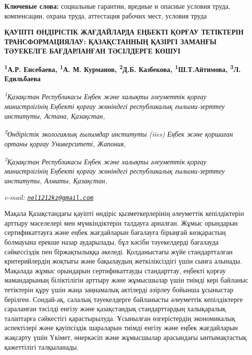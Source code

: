 {\bfseries Ключевые слова:} социальные гарантии, вредные и опасные условия
труда, компенсации, охрана труда, аттестация рабочих мест, условия труда

\begin{articleheader}
{\bfseries ҚАУІПТІ ӨНДІРІСТІК ЖАҒДАЙЛАРДА ЕҢБЕКТІ ҚОРҒАУ ТЕТІКТЕРІН
ТРАНСФОРМАЦИЯЛАУ: ҚАЗАҚСТАННЫҢ ҚАЗІРГІ ЗАМАНҒЫ ТӘУЕКЕЛГЕ БАҒДАРЛАНҒАН
ТӘСІЛДЕРГЕ КӨШУІ}

{\bfseries
\textsuperscript{1}А.Р. Енсебаева\textsuperscript{\envelope },
\textsuperscript{1}А. М. Курманов,
\textsuperscript{2}Д.Б. Казбекова,
\textsuperscript{1}Ш.Т.Айтимова,
\textsuperscript{3}Л. Едильбаева}
\end{articleheader}

\begin{affiliation}
\emph{\textsuperscript{1}Қазақстан Республикасы Еңбек және халықты
әлеуметтік қорғау министрлігінің Еңбекті қорғау жөніндегі республикалық
ғылыми-зерттеу институты, Астана, Қазақстан,}

\emph{\textsuperscript{2}Өндірістік экологиялық ғылымдар институты
(iies) Еңбек және қоршаған ортаны қорғау Университеті, Жапония,}

\emph{\textsuperscript{3}Қазақстан Республикасы Еңбек және халықты
әлеуметтік қорғау министрлігінің Еңбекті қорғау жөніндегі республикалық
ғылыми-зерттеу институты, Алматы, Қазақстан,}

\emph{e-mail:
\href{mailto:nel1212kz@gmail.com}{\nolinkurl{nel1212kz@gmail.com}}}
\end{affiliation}

Мақала Қазақстандағы қауіпті өндіріс қызметкерлерінің әлеуметтік
кепілдіктерін арттыру мәселелері мен мүмкіндіктерін талдауға арналған.
Жұмыс орындарын сертификаттауға және еңбек жағдайларын бағалауға
бірыңғай көзқарастың болмауына ерекше назар аударылады, бұл кәсіби
тәуекелдерді бағалауда сәйкессіздік пен біржақтылыққа әкеледі.
Қолданыстағы жүйе стандартталған критерийлердің жоқтығы және бақылаудың
жеткіліксіздігі үшін сынға алынады. Мақалада жұмыс орындарын
сертификаттауды стандарттау, еңбекті қорғау мамандарының біліктілігін
арттыру және жұмысшылар үшін тиімді кері байланыс тетіктерін құру үшін
жаңа заңнамалық актілерді әзірлеу бойынша ұсыныстар берілген. Сондай-ақ,
салалық тәуекелдерге байланысты әлеуметтік кепілдіктерге сараланған
тәсілді енгізу және қазақстандық стандарттардың халықаралық талаптарға
сәйкестігі қарастырылуда. Ұсынылған өзгерістердің экономикалық
аспектілері және қауіпсіздік шараларын тиімді енгізу және еңбек
жағдайларын жақсарту үшін Үкімет, өнеркәсіп және жұмысшылар арасындағы
ынтымақтастық қажеттілігі талқыланады.


